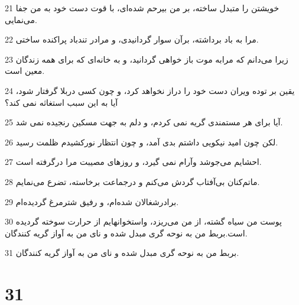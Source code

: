 \par 21 خویشتن را متبدل ساخته، بر من بیرحم شده‌ای، با قوت دست خود به من جفا می‌نمایی.
\par 22 مرا به باد برداشته، برآن سوار گردانیدی، و مرادر تندباد پراکنده ساختی.
\par 23 زیرا می‌دانم که مرابه موت باز خواهی گردانید، و به خانه‌ای که برای همه زندگان معین است.
\par 24 یقین بر توده ویران دست خود را دراز نخواهد کرد، و چون کسی دربلا گرفتار شود، آیا به این سبب استغاثه نمی کند؟
\par 25 آیا برای هر مستمندی گریه نمی کردم، و دلم به جهت مسکین رنجیده نمی شد.
\par 26 لکن چون امید نیکویی داشتم بدی آمد، و چون انتظار نورکشیدم ظلمت رسید.
\par 27 احشایم می‌جوشد وآرام نمی گیرد، و روزهای مصیبت مرا درگرفته است.
\par 28 ماتم‌کنان بی‌آفتاب گردش می‌کنم و درجماعت برخاسته، تضرع می‌نمایم.
\par 29 برادرشغالان شده‌ام، و رفیق شترمرغ گردیده‌ام.
\par 30 پوست من سیاه گشته، از من می‌ریزد، واستخوانهایم از حرارت سوخته گردیده است.بربط من به نوحه گری مبدل شده و نای من به آواز گریه کنندگان.
\par 31 بربط من به نوحه گری مبدل شده و نای من به آواز گریه کنندگان.
 
\chapter{31}

